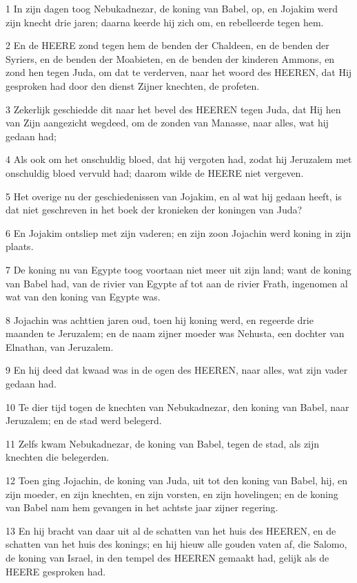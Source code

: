 \par 1 In zijn dagen toog Nebukadnezar, de koning van Babel, op, en Jojakim werd zijn knecht drie jaren; daarna keerde hij zich om, en rebelleerde tegen hem.
\par 2 En de HEERE zond tegen hem de benden der Chaldeen, en de benden der Syriers, en de benden der Moabieten, en de benden der kinderen Ammons, en zond hen tegen Juda, om dat te verderven, naar het woord des HEEREN, dat Hij gesproken had door den dienst Zijner knechten, de profeten.
\par 3 Zekerlijk geschiedde dit naar het bevel des HEEREN tegen Juda, dat Hij hen van Zijn aangezicht wegdeed, om de zonden van Manasse, naar alles, wat hij gedaan had;
\par 4 Als ook om het onschuldig bloed, dat hij vergoten had, zodat hij Jeruzalem met onschuldig bloed vervuld had; daarom wilde de HEERE niet vergeven.
\par 5 Het overige nu der geschiedenissen van Jojakim, en al wat hij gedaan heeft, is dat niet geschreven in het boek der kronieken der koningen van Juda?
\par 6 En Jojakim ontsliep met zijn vaderen; en zijn zoon Jojachin werd koning in zijn plaats.
\par 7 De koning nu van Egypte toog voortaan niet meer uit zijn land; want de koning van Babel had, van de rivier van Egypte af tot aan de rivier Frath, ingenomen al wat van den koning van Egypte was.
\par 8 Jojachin was achttien jaren oud, toen hij koning werd, en regeerde drie maanden te Jeruzalem; en de naam zijner moeder was Nehusta, een dochter van Elnathan, van Jeruzalem.
\par 9 En hij deed dat kwaad was in de ogen des HEEREN, naar alles, wat zijn vader gedaan had.
\par 10 Te dier tijd togen de knechten van Nebukadnezar, den koning van Babel, naar Jeruzalem; en de stad werd belegerd.
\par 11 Zelfs kwam Nebukadnezar, de koning van Babel, tegen de stad, als zijn knechten die belegerden.
\par 12 Toen ging Jojachin, de koning van Juda, uit tot den koning van Babel, hij, en zijn moeder, en zijn knechten, en zijn vorsten, en zijn hovelingen; en de koning van Babel nam hem gevangen in het achtste jaar zijner regering.
\par 13 En hij bracht van daar uit al de schatten van het huis des HEEREN, en de schatten van het huis des konings; en hij hieuw alle gouden vaten af, die Salomo, de koning van Israel, in den tempel des HEEREN gemaakt had, gelijk als de HEERE gesproken had.

